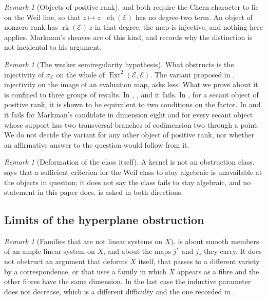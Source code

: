 \documentclass[11pt,reqno]{amsart}
\theoremstyle{plain}
\theoremstyle{definition}
\theoremstyle{remark}
\newtheorem{remark}[theorem]{Remark}
\newcommand{\cE}{\mathcal{E}}
\DeclareMathOperator{\ch}{ch}
\DeclareMathOperator{\rk}{rk}
\DeclareMathOperator{\Ext}{Ext}
\begin{document}
\begin{remark}[Objects of positive rank]\label{rem:positiverankscope}
\cite[Theorem~9.7]{paperI} and \cite[Corollary~9.18]{paperI} both require the Chern character to
lie on the Weil line, so that $z\mapsto z\cdot\ch(\cE)$ has no degree-two
term. An object of nonzero rank has $\rk(\cE)\,z$ in that degree, the map is
injective, and nothing here applies. Markman's sheaves are of this kind, and
\cite[Remark~9.9]{paperI} records why the distinction is not incidental to his
argument.
\end{remark}

\begin{remark}[The weaker semiregularity hypothesis]\label{rem:weakerscope}
What \cite[Corollary~9.18]{paperI} obstructs is the injectivity of $\sigma_{\cE}$ on the
whole of $\Ext^{2}(\cE,\cE)$. The variant proposed in
\cite[Question 11.4]{Mar25b}, injectivity on the image of an evaluation map,
asks less. What we prove about it is confined to three groups of results.
In \cite[Theorem~9.19]{paperI}, \cite[Proposition~4.18]{paperII}, \cite[Theorem~9.20]{paperI} and
\cite[Corollary~4.21]{paperII} it fails. In \cite[Theorem~4.56]{paperII}, for a secant object of
positive rank, it is shown to be equivalent to two conditions on the factor.
In \cite[Theorem~4.61]{paperII} and \cite[Corollary~4.63]{paperII} it fails for
Markman's candidate in dimension eight and for every secant object whose
support has two transversal branches of codimension two through a point. We
do not decide the variant for any other object of positive rank, nor whether
an affirmative answer to the question would follow from it.
\end{remark}

\begin{remark}[Deformation of the class itself]\label{rem:notnondeform}
A kernel is not an obstruction class. \cite[Corollary~9.18]{paperI} says that a sufficient
criterion for the Weil class to stay algebraic is unavailable at the objects
in question; it does not say the class fails to stay algebraic, and no
statement in this paper does. \cite[Question~15.13]{paperI} is asked in both
directions.
\end{remark}

\subsection{Limits of the hyperplane obstruction}

\begin{remark}[Families that are not linear systems on \texorpdfstring{$X$}{X}]%
\label{rem:notlinear}
\cite[Theorem~10.3]{paperI} is about smooth members of an ample linear system on
$X$, and about the maps $j^{*}$ and $j_{*}$ they carry. It does not obstruct
an argument that deforms $X$ itself, that passes to a different variety by a
correspondence, or that uses a family in which $X$ appears as a fibre and the
other fibres have the same dimension. In the last case the inductive parameter
does not decrease, which is a different difficulty and the one recorded in
\cite[Remark~10.10]{paperI}.
\end{remark}
\end{document}
